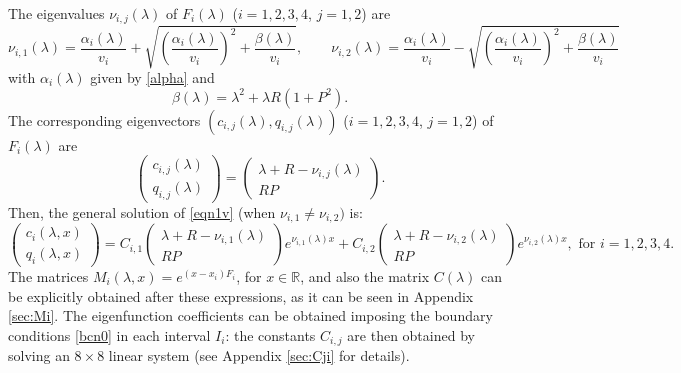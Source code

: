 \documentclass[a4paper]{article}
\newcommand{\R}{\ensuremath{\mathbb{R}}}
\newcommand{\X}[3]{#1_{#3,#2}}
\numberwithin{equation}{section}
\begin{document}
The eigenvalues $\X{\nu}{j}{i}(\lambda)$ of $F_i(\lambda)$ ($i=1,2,3,4$, $j=1,2$) are
\begin{equation}\label{eq:nu}
 \X{\nu}{1}{i}(\lambda) = \frac{\alpha_i(\lambda)}{v_i} + \sqrt{\left(\frac{\alpha_i(\lambda)}{v_i}\right)^2 + \frac{\beta(\lambda)}{v_i}} ,\qquad
 \X{\nu}{2}{i}(\lambda) = \frac{\alpha_i(\lambda)}{v_i} - \sqrt{\left(\frac{\alpha_i(\lambda)}{v_i}\right)^2 + \frac{\beta(\lambda)}{v_i}}
\end{equation}
with $\alpha_i(\lambda)$ given by \eqref{alpha} and
\begin{equation}\label{eq:beta}
\beta(\lambda) = \lambda^2 + \lambda R (1 + P^2).
\end{equation}
The corresponding eigenvectors $(\X{c}{j}{i}(\lambda),\X{q}{j}{i}(\lambda))$ ($i=1,2,3,4$, $j=1,2$) of $F_i(\lambda)$ are
\begin{equation*}%
 \begin{pmatrix} \X{c}{j}{i}(\lambda) \\ \X{q}{j}{i}(\lambda) \end{pmatrix} = \begin{pmatrix} \lambda + R - \X{\nu}{j}{i}(\lambda) \\ RP \end{pmatrix}.
\end{equation*}
Then, the general solution of \eqref{eqn1v} (when $\X{\nu}{1}{i}\ne \X{\nu}{2}{i})$ is:
\begin{equation}\label{eq:fupA}
\begin{pmatrix} c_i(\lambda,x) \\ q_i(\lambda,x) \end{pmatrix} = \X{C}{1}{i} \begin{pmatrix} \lambda + R - \X{\nu}{1}{i}(\lambda) \\ RP \end{pmatrix} e^{\X{\nu}{1}{i}(\lambda)x} + \X{C}{2}{i} \begin{pmatrix} \lambda + R - \X{\nu}{2}{i}(\lambda) \\ RP \end{pmatrix} e^{\X{\nu}{2}{i}(\lambda)x},\textrm{ for }i = 1, 2, 3, 4.
\end{equation}
The matrices $M_i(\lambda,x)=e^{(x-x_i)F_i }$, for $x\in\R$, and also the matrix $C(\lambda)$ can be explicitly obtained after these expressions, as it can be seen in Appendix \ref{sec:Mi}. The eigenfunction coefficients can be obtained imposing the boundary conditions \eqref{bcn0} in each interval $I_i$: the constants  $\X{C}{j}{i}$ are then obtained by solving an $8\times 8$ linear system (see Appendix \ref{sec:Cji} for details).
\end{document}
